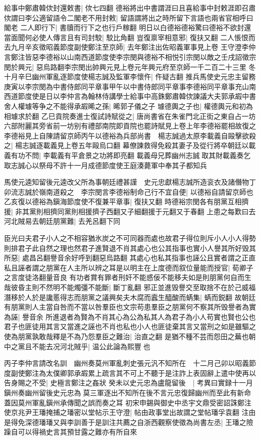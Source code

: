 給事中鄭肅韓佽封還敕書|{
	佽七四翻}
德裕將出中書謂涯曰且喜給事中封敕涯即召肅佽謂曰李公適留語令二閣老不用封敕|{
	留語謂將出之時所留下言語也兩省官相呼曰閣老}
二人即行下|{
	書牘而行下之也行戶稼翻}
明日以白德裕德裕驚曰德裕不欲封還當面聞何必使人傳言且有司封駮|{
	駮比角翻}
豈復禀宰相意邪|{
	復扶又翻}
二人悵恨而去九月辛亥徵昭義節度副使鄭注至京師|{
	去年鄭注出佐昭義軍事見上卷}
王守澄李仲言鄭注皆惡李德裕以山南西道節度使李宗閔與德裕不相悦引宗閔以敵之壬戌詔徵宗閔於興元|{
	惡烏路翻李宗閔出帥興元見上卷元年興元府至京師一千二百二十三里}
冬十月辛巳幽州軍亂逐節度使楊志誠及監軍李懷仵|{
	仵疑古翻}
推兵馬使史元忠主留務　庚寅以李宗閔為中書侍郎同平章事甲午以中書侍郎同平章事李德裕同平章事充山南西道節度使是日以李仲言為翰林侍講學士給事中高銖鄭肅韓佽諫議大夫郭承嘏中書舍人權璩等争之不能得承嘏晞之孫|{
	晞郭子儀之子}
璩德輿之子也|{
	權德輿元和初為相璩求於翻}
乙巳貢院奏進士復試詩賦從之|{
	唐尚書省在朱雀門北正街之東自占一坊六部附麗其旁省前一坊别有禮部南院即貢院也罷詩賦見上卷上年李德裕罷相故復之}
李德裕見上自陳請留京師丙午以德裕為兵部尚書　楊志誠過太原李載義自毆擊欲殺之|{
	楊志誠逐載義見上卷五年毆烏口翻}
幕僚諫救得免殺其妻子及從行將卒朝廷以載義有功不問|{
	李載義有平倉景之功將即亮翻}
載義母兄葬幽州志誠取其財載義奏乞取志誠心以祭母不許十一月成德節度使王庭湊薨軍中奉其子都知兵

馬使元逵知留後元逵改父所為事朝廷禮甚謹　史元忠獻楊志誠所造衮衣及諸僭物丁卯流志誠於嶺南道殺之　李宗閔言李德裕制命己行不宜自便|{
	以德裕自請留京師也}
乙亥復以德裕為鎭海節度使不復兼平章事|{
	復扶又翻}
時德裕宗閔各有朋黨互相擠援|{
	非其黨則相擠同黨則相援擠子西翻又子細翻援于元翻又于春翻}
上患之每歎曰去河北賊易去朝廷朋黨難|{
	去羌呂翻下同}


臣光曰夫君子小人之不相容猶氷炭之不可同器而處也故君子得位則斥小人小人得勢則排君子此自然之理也然君子進賢退不肖其處心也公其指事也實小人譽其所好毁其所惡|{
	處昌呂翻譽音余好呼到翻惡烏路翻}
其處心也私其指事也誣公且實者謂之正直私且誣者謂之朋黨在人主所以辨之耳是以明主在上度德而叙位量能而授官|{
	荀卿子之言度徒洛翻量音良}
有功者賞有罪者刑奸不能惑佞不能移夫如是則朋黨何自而生哉彼昏主則不然明不能燭彊不能斷|{
	斷丁亂翻}
邪正並進毁譽交至取捨不在於己威福潛移於人於是讒慝得志而朋黨之議興矣夫木腐而蠧生醯酸而蜹集|{
	蜹而鋭翻}
故朝廷有朋黨則人主當自咎而不當以咎羣臣也文宗苟患羣臣之朋黨何不察其所毁譽者為實為誣|{
	譽音余}
所進退者為賢為不肖其心為公為私其人為君子為小人苟實也賢也公也君子也匪徒用其言又當進之誣也不肖也私也小人也匪徒棄其言又當刑之如是雖驅之使為朋黨孰敢哉釋是不為乃怨羣臣之難治|{
	治直之翻}
是猶不種不芸而怨田之蕪也朝中之黨且不能去况河北賊乎|{
	温公此論為熙豐也}


丙子李仲言請改名訓　幽州奏莫州軍亂刺史張元汎不知所在　十二月己卯以昭義節度副使鄭注為太僕卿郭承嘏累上疏言其不可上不聽于是注詐上表固辭上遣中使再以告身賜之不受|{
	史極言鄭注之姦狀}
癸未以史元忠為盧龍留後　|{
	考異曰實録十一月鎭州奏幽州留後史元忠為莫三軍逐出不知所在後不言元忠復歸幽州而至此有新命蓋因莫州軍亂鎭州承傳聞之誤而奏之耳}
初宋申錫與御史中丞宇文鼎受密詔誅鄭注使京兆尹王璠掩捕之璠密以堂帖示王守澄|{
	帖由政事堂出故謂之堂帖璠孚袁翻}
注由是得免深德璠璠又與李訓善于是訓注共薦之自浙西觀察使徵為尚書左丞|{
	王璠之險躁自可以得禍史言其預甘露之難亦有所自來}



